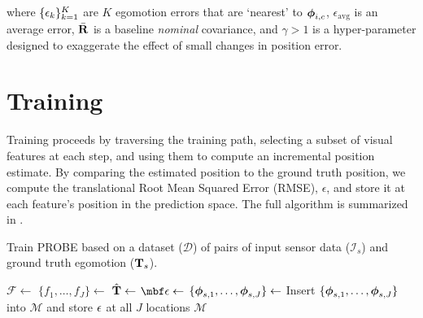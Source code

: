 where $\{\epsilon_k\}_{k=1}^K$ are $K$ egomotion errors that are `nearest' to $\boldsymbol{\mathbf{\phi}}_{i,c}$, $\epsilon_\text{avg}$ is an average error, $\bar{\boldsymbol{\mathbf{R}}}$ is a baseline \textit{nominal} covariance, and $\gamma > 1$ is a hyper-parameter designed to exaggerate the effect of small changes in position error.

\section{Training}
Training proceeds by traversing the training path, selecting a subset of visual features at each step, and using them to compute an incremental position estimate. By comparing the estimated position to the ground truth position, we compute the translational Root Mean Squared Error (RMSE), $\epsilon$, and store it at each feature's position in the prediction space. The full algorithm is summarized in . 

\begin{algorithm}
  \caption{Train PROBE based on a dataset ($\mathcal{D}$) of pairs of input sensor data ($\mathcal{I}_s$) and ground truth egomotion ($\boldsymbol{\mathbf{T}}_s$).}
   \label{alg:probe_train}
  \begin{algorithmic}
	\State $\mathcal{F} \gets$ 
	\State $\{f_1, \dots, f_J\} \gets$ 
	\State $\hat{\boldsymbol{\mathbf{T}}} \gets$ 
	\State $\mbf \PROBEPoseError  \gets$ 
	\State $\{\boldsymbol{\mathbf{\phi}}_{s,1}, \dots, \boldsymbol{\mathbf{\phi}}_{s,J}\} \gets$ 
	\State Insert $\{\boldsymbol{\mathbf{\phi}}_{s,1}, \dots,  \boldsymbol{\mathbf{\phi}}_{s,J}\}$ into $\mathcal{M}$ and store $\epsilon$ at all $J$ locations
	\EndFor
      \EndFor
      \State\Return  $\mathcal{M}$
    \EndFunction
  \end{algorithmic}
\end{algorithm}

